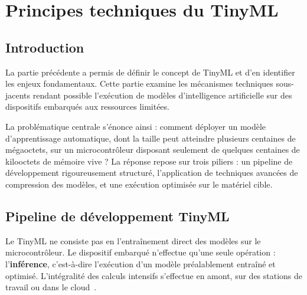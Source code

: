 \chapter{Principes techniques du TinyML}
\label{ch:principes}

\section{Introduction}

La partie précédente a permis de définir le concept de TinyML et d'en
identifier les enjeux fondamentaux. Cette partie examine les mécanismes
techniques sous-jacents rendant possible l'exécution de modèles d'intelligence
artificielle sur des dispositifs embarqués aux ressources limitées.

La problématique centrale s'énonce ainsi : comment déployer un modèle
d'apprentissage automatique, dont la taille peut atteindre plusieurs centaines
de mégaoctets, sur un microcontrôleur disposant seulement de quelques centaines
de kilooctets de mémoire vive ? La réponse repose sur trois piliers : un
pipeline de développement rigoureusement structuré, l'application de techniques
avancées de compression des modèles, et une exécution optimisée sur le matériel
cible.

\section{Pipeline de développement TinyML}

Le TinyML ne consiste pas en l'entraînement direct des modèles sur le
microcontrôleur. Le dispositif embarqué n'effectue qu'une seule opération :
l'\textbf{inférence}, c'est-à-dire l'exécution d'un modèle préalablement
entraîné et optimisé. L'intégralité des calculs intensifs s'effectue en amont,
sur des stations de travail ou dans le cloud~\cite{warden2019tinyml}.

